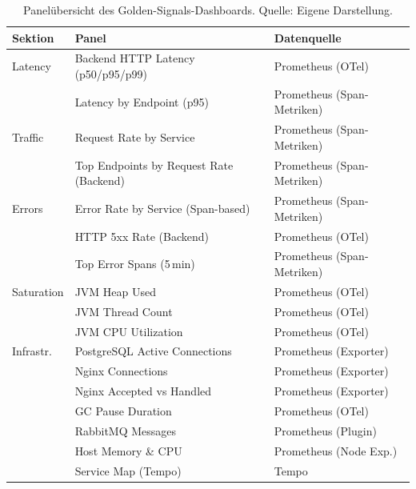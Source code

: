 \begin{table}[H]
\centering
\caption[Panelübersicht des Golden-Signals-Dashboards.]{Panelübersicht des Golden-Signals-Dashboards. \small Quelle: Eigene Darstellung.}
\label{tab:dashboard-panels}
\small
\begin{tabularx}{\textwidth}{l >{\RaggedRight\arraybackslash}X l}
\toprule
\textbf{Sektion} & \textbf{Panel} & \textbf{Datenquelle} \\
\midrule
Latency     & Backend HTTP Latency (p50/p95/p99)       & Prometheus (OTel) \\
            & Latency by Endpoint (p95)                & Prometheus (Span-Metriken) \\[4pt]
Traffic     & Request Rate by Service                  & Prometheus (Span-Metriken) \\
            & Top Endpoints by Request Rate (Backend)  & Prometheus (Span-Metriken) \\[4pt]
Errors      & Error Rate by Service (Span-based)       & Prometheus (Span-Metriken) \\
            & HTTP 5xx Rate (Backend)                  & Prometheus (OTel) \\
            & Top Error Spans (5\,min)                 & Prometheus (Span-Metriken) \\[4pt]
Saturation  & JVM Heap Used                            & Prometheus (OTel) \\
            & JVM Thread Count                         & Prometheus (OTel) \\
            & JVM CPU Utilization                      & Prometheus (OTel) \\[4pt]
Infrastr.   & PostgreSQL Active Connections             & Prometheus (Exporter) \\
            & Nginx Connections                         & Prometheus (Exporter) \\
            & Nginx Accepted vs Handled                & Prometheus (Exporter) \\
            & GC Pause Duration                        & Prometheus (OTel) \\
            & RabbitMQ Messages                        & Prometheus (Plugin) \\
            & Host Memory \& CPU                       & Prometheus (Node Exp.) \\
            & Service Map (Tempo)                      & Tempo \\
\bottomrule
\end{tabularx}
\end{table}

